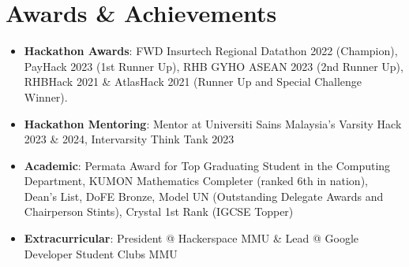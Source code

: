 \documentclass[a4paper,12pt]{article}
\newcommand{\resumeItemTwoFields}[2]{
  \item{
    \textbf{#1}{: #2 \vspace{-2pt}}
  }
}
\newcommand{\resumeSubItem}[2]{\resumeItemTwoFields{#1}{#2}\vspace{-4pt}}
\newcommand{\resumeSubHeadingListStart}{\begin{itemize}[leftmargin=*]}
\newcommand{\resumeSubHeadingListEnd}{\end{itemize}}
\begin{document}
\vspace{-5pt}

\section{Awards \& Achievements}

  \resumeSubHeadingListStart
    \resumeSubItem{Hackathon Awards}{FWD Insurtech Regional Datathon 2022 (Champion), PayHack 2023 (1st Runner Up), RHB GYHO ASEAN 2023 (2nd Runner Up), RHBHack 2021 \& AtlasHack 2021 (Runner Up and Special Challenge Winner).}
    \resumeSubItem{Hackathon Mentoring}{Mentor at Universiti Sains Malaysia's Varsity Hack 2023 \& 2024, Intervarsity Think Tank 2023}
    \resumeSubItem{Academic}{Permata Award for Top Graduating Student in the Computing Department, KUMON Mathematics Completer (ranked 6th in nation), Dean's List, DoFE Bronze, Model UN (Outstanding Delegate Awards and Chairperson Stints), Crystal 1st Rank (IGCSE Topper)}
    \resumeSubItem{Extracurricular}{President @ Hackerspace MMU \& Lead @ Google Developer Student Clubs MMU}
  \resumeSubHeadingListEnd

\end{document}
